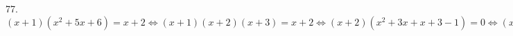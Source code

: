 77. $(x+1)(x^2+5x+6)=x+2\Leftrightarrow(x+1)(x+2)(x+3)=x+2\Leftrightarrow(x+2)(x^2+3x+x+3-1)=0\Leftrightarrow(x+2)(x^2+4x+2)=0\Leftrightarrow
x\in\{-2-\sqrt{2}; -2; \sqrt{2}-2\}.$\\
